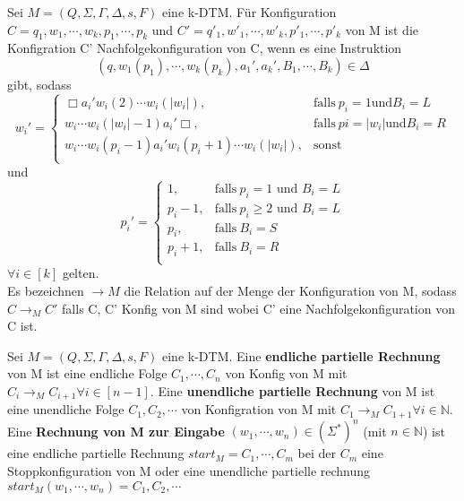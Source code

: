   Sei \(M = (Q, \Sigma, \Gamma, \Delta, s, F)\) eine k-DTM. Für Konfiguration \(C = q_{1}, w_{1}, \cdots, w_{k}, p_{1},\cdots, p_{k}\) und \(C' = q'_{1}, w'_{1}, \cdots, w'_{k}, p'_{1},\cdots, p'_{k}\) von M ist die Konfigration C' Nachfolgekonfiguration von C, wenn es eine Instruktion 
  \[
    (q, w_{1}(p_{1}), \cdots, w_{k}(p_{k}), a_{1}', a_{k}', B_{1}, \cdots, B_{k}) \in \Delta
  \]
  gibt, sodass 
  \begin{equation*}
    w_{i}' = 
    \begin{cases}
      \Box a_{i}' w_{i}(2) \cdots w_{i}(|w_{i}|), & \text{falls}\ p_{i} = 1 \text{und}  B_{i} = L \\
      w_{i} \cdots w_{i}(|w_{i}| - 1) a_{i}' \Box, & \text{falls}\ p{i} = |w_{i}| \text{und} B_{i} = R \\
      w_{i} \cdots w_{i}(p_{i}-1) a_{i}' w_{i}(p_{i} + 1) \cdots w_{i}(|w_{i}|), & \text{sonst} \\
    \end{cases}
  \end{equation*}
  und 
  \begin{equation*}
    p_{i}' = 
    \begin{cases}
      1, & \text{falls}\ p_{i} = 1 \text{ und } B_{i} = L\\
      p_{i} - 1, & \text{falls}\ p_{i} \geq 2 \text{ und } B_{i} = L\\
      p_{i}, & \text{falls}\ B_{i} = S\\
      p_{i} + 1, & \text{falls}\ B_{i} = R\\
    \end{cases}
  \end{equation*}
  \(\forall i \in [k]\) gelten. \\ Es bezeichnen \(\rightarrow M\)  die Relation auf der Menge der Konfiguration von M, sodass \(C \rightarrow_{M} C'\) falls C, C' Konfig von M sind wobei C' eine Nachfolgekonfiguration von C ist.

  Sei \(M = (Q, \Sigma, \Gamma, \Delta, s, F)\) eine k-DTM. Eine \textbf{endliche partielle Rechnung} von M ist eine endliche Folge \(C_{1}, \cdots, C_{n}\) von Konfig von M mit \(C_{i} \rightarrow_{M} C_{i+1} \forall i \in [n-1]\). Eine \textbf{unendliche partielle Rechnung} von M ist eine unendliche Folge \(C_{1}, C_{2}, \cdots\) von Konfigration von M mit \(C_{1} \rightarrow_{M} C_{1+1} \forall i \in \mathbb{N}\). Eine \textbf{Rechnung von M zur Eingabe } \((w_{1}, \cdots, w_{n}) \in (\Sigma^*)^n\) (mit \(n \in \mathbb{N}\)) ist eine endliche partielle Rechnung \(start_M = C_1, \cdots, C_m\) bei der \(C_m\) eine Stoppkonfiguration von M oder eine unendliche partielle rechnung \(start_M(w_1, \cdots, w_n) = C_1, C_2, \cdots\)

